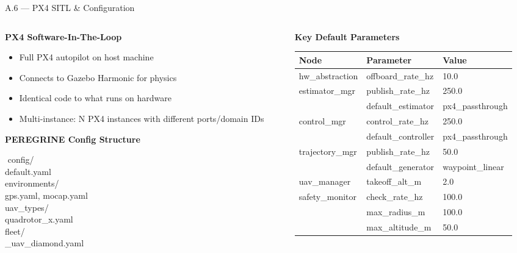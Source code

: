 \documentclass[aspectratio=169, 10pt]{beamer}
\begin{document}
\begin{frame}{A.6 --- PX4 SITL \& Configuration}
\begin{columns}[T]
\begin{column}{0.48\textwidth}
\textbf{PX4 Software-In-The-Loop}
\begin{itemize}\small
  \item Full PX4 autopilot on host machine
  \item Connects to Gazebo Harmonic for physics
  \item Identical code to what runs on hardware
  \item Multi-instance: N PX4 instances with different ports/domain IDs
\end{itemize}

\vspace{0.3em}
\textbf{PEREGRINE Config Structure}

\vspace{0.2em}
\ttfamily\scriptsize
\begin{tabbing}
\hspace{0.3cm}\=\hspace{0.3cm}\=\kill
config/ \\
\> default.yaml \\
\> environments/ \\
\>\> gps.yaml, mocap.yaml \\
\> uav\_types/ \\
\>\> quadrotor\_x.yaml \\
\> fleet/ \\
\>\_uav\_diamond.yaml
\end{tabbing}
\rmfamily
\end{column}

\begin{column}{0.48\textwidth}
\textbf{Key Default Parameters}

\vspace{0.3em}
\scriptsize
\begin{tabular}{@{}lll@{}}
\toprule
\textbf{Node} & \textbf{Parameter} & \textbf{Value} \\
\midrule
hw\_abstraction & offboard\_rate\_hz & 10.0 \\
estimator\_mgr & publish\_rate\_hz & 250.0 \\
 & default\_estimator & px4\_passthrough \\
control\_mgr & control\_rate\_hz & 250.0 \\
 & default\_controller & px4\_passthrough \\
trajectory\_mgr & publish\_rate\_hz & 50.0 \\
 & default\_generator & waypoint\_linear \\
uav\_manager & takeoff\_alt\_m & 2.0 \\
safety\_monitor & check\_rate\_hz & 100.0 \\
 & max\_radius\_m & 100.0 \\
 & max\_altitude\_m & 50.0 \\
\bottomrule
\end{tabular}


\end{column}
\end{columns}
\end{frame}
\end{document}
